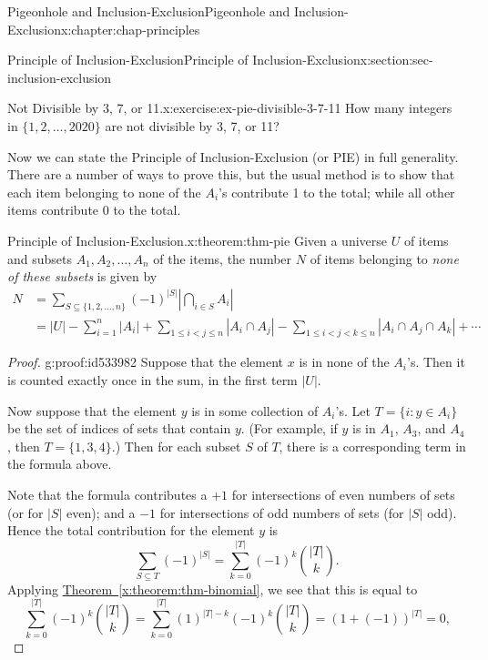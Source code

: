 \documentclass[oneside,10pt,]{book}
\newcommand{\xreffont}{\relax}
\numberwithin{equation}{section}
\newcommand{\lt}{<}
\newcommand{\amp}{&}
\begin{document}
\begin{chapterptx}{Pigeonhole and Inclusion-Exclusion}{}{Pigeonhole and Inclusion-Exclusion}{}{}{x:chapter:chap-principles}
\begin{sectionptx}{Principle of Inclusion-Exclusion}{}{Principle of Inclusion-Exclusion}{}{}{x:section:sec-inclusion-exclusion}
%
\begin{inlineexercise}{Not Divisible by 3, 7, or 11.}{x:exercise:ex-pie-divisible-3-7-11}%
How many integers in \(\{1,2,\ldots,2020\}\) are not divisible by 3, 7, or 11?%
\end{inlineexercise}%
Now we can state the Principle of Inclusion-Exclusion (or PIE) in full generality. There are a number of ways to prove this, but the usual method is to show that each item belonging to none of the \(A_i\)'s contribute 1 to the total; while all other items contribute 0 to the total.%
\begin{theorem}{Principle of Inclusion-Exclusion.}{}{x:theorem:thm-pie}%
Given a universe \(U\) of items and subsets \(A_1,A_2,\ldots,A_n\) of the items, the number \(N\) of items belonging to \emph{none of these subsets} is given by%
\begin{align*}
N \amp = \sum_{S \subseteq \{1,2,\ldots,n\}} (-1)^{|S|} \left| \bigcap_{i\in S} A_i\right|\\
\amp  = |U| - \sum_{i = 1}^n |A_i| + \sum_{1 \leq i \lt j \leq n} |A_i \cap A_j| - \sum_{1 \leq i \lt j \lt k \leq n} |A_i \cap A_j \cap A_k| + \cdots 
\end{align*}
%
\end{theorem}
\begin{proof}{}{g:proof:id533982}
Suppose that the element \(x\) is in none of the \(A_i\)'s. Then it is counted exactly once in the sum, in the first term \(|U|\).%
\par
Now suppose that the element \(y\) is in some collection of \(A_i\)'s. Let \(T = \{i : y \in A_i\}\) be the set of indices of sets that contain \(y\). (For example, if \(y\) is in \(A_1\), \(A_3\), and \(A_4\), then \(T = \{1,3,4\}\).) Then for each subset \(S\) of \(T\), there is a corresponding term in the formula above.%
\par
Note that the formula contributes a \(+1\) for intersections of even numbers of sets (or for \(|S|\) even); and a \(-1\) for intersections of odd numbers of sets (for \(|S|\) odd). Hence the total contribution for the element \(y\) is%
\begin{equation*}
\sum_{S \subseteq T} (-1)^{|S|} = \sum_{k=0}^{|T|} (-1)^k\binom{|T|}{k}\text{.}
\end{equation*}
Applying \hyperref[x:theorem:thm-binomial]{Theorem~{\xreffont\ref{x:theorem:thm-binomial}}}, we see that this is equal to%
\begin{equation*}
\sum_{k=0}^{|T|} (-1)^k\binom{|T|}{k} = \sum_{k=0}^{|T|} (1)^{|T|-k}(-1)^k\binom{|T|}{k} = \left( 1 + (-1) \right)^{|T|} = 0\text{,}

\end{equation*}
\end{proof}
\end{sectionptx}
\end{chapterptx}
\end{document}
